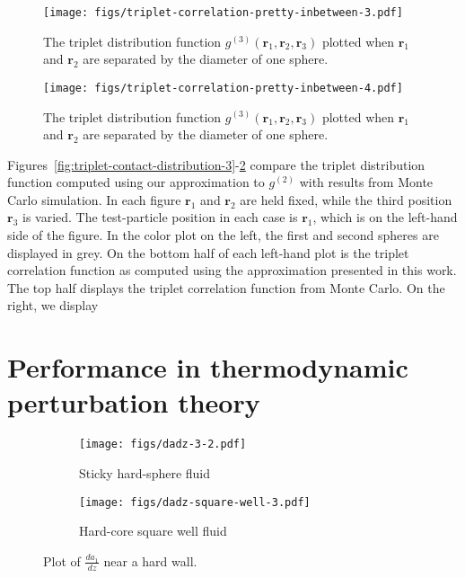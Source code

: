 \documentclass[letterpaper,twocolumn,amsmath,amssymb,pre,aps,10pt]{revtex4-1}
\newcommand{\rr}{\textbf{r}}
\begin{document}
\begin{figure}
  \texttt{[image: figs/triplet-correlation-pretty-inbetween-3.pdf]}
  \caption{The triplet distribution function
    $g^{(3)}(\rr_1,\rr_2,\rr_3)$ plotted when $\rr_1$ and $\rr_2$ are
    separated by the diameter of one sphere.}\label{fig:triplet-inbetween-distribution-3}
\end{figure}
\begin{figure}
  \texttt{[image: figs/triplet-correlation-pretty-inbetween-4.pdf]}
  \caption{The triplet distribution function
    $g^{(3)}(\rr_1,\rr_2,\rr_3)$ plotted when $\rr_1$ and $\rr_2$ are
    separated by the diameter of one sphere.}\label{fig:triplet-inbetween-distribution-4}
\end{figure}

Figures~\ref{fig:triplet-contact-distribution-3}-\ref{fig:triplet-inbetween-distribution-4}
compare the triplet distribution function computed using our
approximation to $g^{(2)}$ with results from Monte Carlo simulation.
In each figure $\rr_1$ and $\rr_2$ are held fixed, while the third
position $\rr_3$ is varied.  The test-particle position in each case
is $\rr_1$, which is on the left-hand side of the figure.  In the
color plot on the left, the first and second spheres are displayed in
grey.  On the bottom half of each left-hand plot is the triplet
correlation function as computed using the approximation presented in
this work.  The top half displays the triplet correlation function
from Monte Carlo.  On the right, we display 


\section{Performance in thermodynamic perturbation theory}

\begin{figure}
  \begin{subfigure}{\columnwidth}
    \texttt{[image: figs/dadz-3-2.pdf]}
    \vspace{-0.8cm}
    \caption{Sticky hard-sphere fluid}\label{fig:dadz-delta}
  \end{subfigure}
  \begin{subfigure}{\columnwidth}
    \texttt{[image: figs/dadz-square-well-3.pdf]}
    \vspace{-0.8cm}
    \caption{Hard-core square well fluid}\label{fig:dadz-square-well}
  \end{subfigure}
  \caption{Plot of $\frac{da_1}{dz}$ near a hard
    wall.}\label{fig:dadz}
\end{figure}
\end{document}
